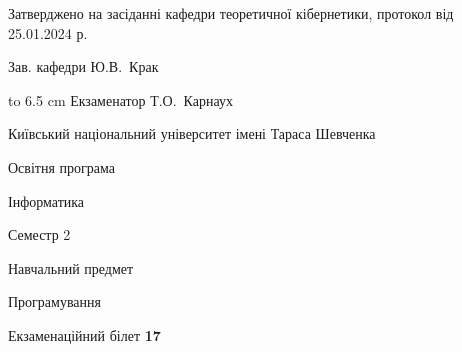 \documentclass[12pt, ukrainian]{article}
\begin{document}
{\smallskip\smallskip \begin {scriptsize} Затверджено на засіданні кафедри теоретичної кібернетики, протокол   від   25.01.2024 р.\par\smallskip\smallskip\smallskip\smallskip
{\parbox {6.5 cm} {Зав. кафедри \dotfill Ю.В.~Крак}}\hspace {0.7cm} {\hbox to 6.5 cm { Екзаменатор \dotfill Т.О.~Карнаух}} \end{scriptsize}}
\newpage
{{\begin {scriptsize}\par
{ \center  Київський національний університет імені Тараса Шевченка \par}
{\parbox {5 cm}{Освітня програма \hfill}{\parbox {7 cm}{Інформатика\hfill}}\parbox {6 cm}{\hfill Семестр 2}}\par
{\parbox {5 cm} {Навчальний предмет \hfill}\parbox {7 cm}{Програмування \hfill}\parbox {6cm}{\hfill}\par}\vspace{-15pt} \end{scriptsize}}{\center Екзаменаційний білет \No \textbf { 17 }\par}}
\end{document}
